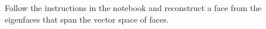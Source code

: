 %
%


%


\begin{exercise}[subtitle={Notebook}]
  Follow the instructions in the notebook and reconstruct a face from the eigenfaces that span the vector space of faces.
\end{exercise}


